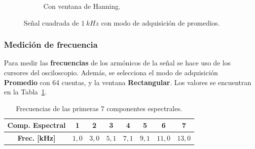 \begin{figure}[H]
\begin{subfigure}[H]{0.40\textwidth}
        \caption{Con ventana de Hanning.}
      \end{subfigure}

      \caption{Señal cuadrada de $1~kHz$ con modo de adquisición de promedios.}
      \label{fig:SeñalCuadModoPromedio}
    \end{figure}

    
    \subsubsection{Medición de frecuencia}
      Para medir las \textbf{frecuencias} de los armónicos de la señal se hace uso de los cursores del osciloscopio.
      Además, se selecciona el modo de adquisición \textbf{Promedio} con 64 cuentas, y la ventana
      \textbf{Rectangular}. Los valores se encuentran en la Tabla~\ref{tab:ComponentesEspectrExp1}.

      \begin{table}[H]
        \centering
      \begin{tabular}{cccccccc} \hline \hline
        \textbf{Comp. Espectral}  &  \textbf{1}  &  \textbf{2}  & \textbf{3}  & \textbf{4} & \textbf{5}  & \textbf{6}  &  \textbf{7}\\ \hline
        \textbf{Frec. [kHz]}   &   $1,0$   &    $3,0$   &   $5,1$  &  $7,1$  &  $9,1$  &  $11,0$  &  $13,0$\\ \hline \hline
        \end{tabular}
        \caption{Frecuencias de las primeras 7 componentes espectrales.}
        \label{tab:ComponentesEspectrExp1}
      \end{table} 

